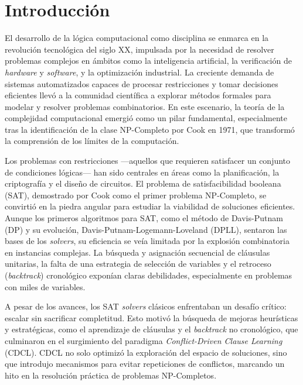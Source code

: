 \chapter*{Introducción}\label{chapter:introduction}
El desarrollo de la lógica computacional como disciplina se enmarca en la revolución tecnológica del siglo XX, impulsada por la necesidad de resolver problemas complejos en ámbitos como la inteligencia artificial, la verificación de \textit{hardware} y \textit{software}, y la optimización industrial. La creciente demanda de sistemas automatizados capaces de procesar restricciones y tomar decisiones eficientes llevó a la comunidad científica a explorar métodos formales para modelar y resolver problemas combinatorios. En este escenario, la teoría de la complejidad computacional emergió como un pilar fundamental, especialmente tras la identificación de la clase NP-Completo por Cook en 1971, que transformó la comprensión de los límites de la computación.

Los problemas con restricciones —aquellos que requieren satisfacer un conjunto de condiciones lógicas— han sido centrales en áreas como la planificación, la criptografía y el diseño de circuitos. El problema de satisfacibilidad booleana (SAT), demostrado por Cook como el primer problema NP-Completo, se convirtió en la piedra angular para estudiar la viabilidad de soluciones eficientes. Aunque los primeros algoritmos para SAT, como el método de Davis-Putnam (DP) y su evolución, Davis-Putnam-Logemann-Loveland (DPLL), sentaron las bases de los \textit{solvers}, su eficiencia se veía limitada por la explosión combinatoria en instancias complejas. La búsqueda y asignaci\'on secuencial de cláusulas unitarias, la falta de una estrategia de selecci\'on de variables y el retroceso (\textit{backtrack}) cronológico exponían claras debilidades, especialmente en problemas con miles de variables.

A pesar de los avances, los SAT \textit{solvers} clásicos enfrentaban un desafío crítico: escalar sin sacrificar completitud. Esto motivó la búsqueda de mejoras heurísticas y estratégicas, como el aprendizaje de cláusulas y el \textit{backtrack} no cronológico, que culminaron en el surgimiento del paradigma \textit{Conflict-Driven Clause Learning} (CDCL). CDCL no solo optimizó la exploración del espacio de soluciones, sino que introdujo mecanismos para evitar repeticiones de conflictos, marcando un hito en la resolución práctica de problemas NP-Completos. 

